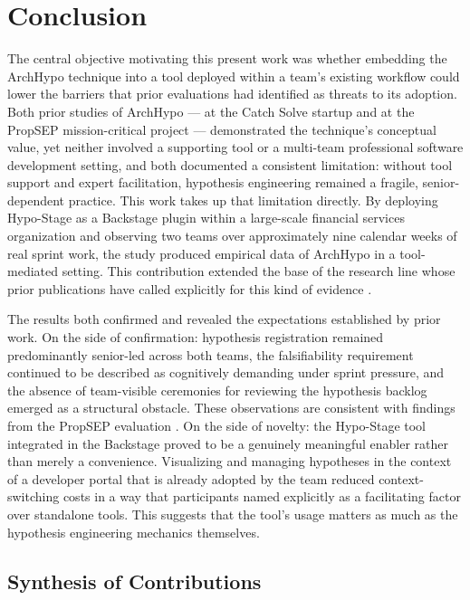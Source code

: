
\chapter{Conclusion}
\label{ch:conclusion}
\label{chap:conclusion}

The central objective motivating this present work was whether embedding the ArchHypo
technique into a tool deployed within a team's existing workflow could lower the barriers
that prior evaluations had identified as threats to its adoption. Both prior studies of
ArchHypo --- at the Catch Solve startup \citep{silva2024ieeesw} and at the PropSEP
mission-critical project \citep{silva2024tse} --- demonstrated the technique's conceptual
value, yet neither involved a supporting tool or a multi-team professional software development setting,
and both documented a consistent limitation: without tool support and expert
facilitation, hypothesis engineering remained a fragile, senior-dependent practice. This
work takes up that limitation directly. By deploying Hypo-Stage as a Backstage plugin
within a large-scale financial services organization and observing two teams over approximately nine calendar weeks of real sprint work, the study produced empirical data of ArchHypo in
a tool-mediated setting. This contribution extended the base of the research line whose prior publications have called explicitly for this kind of evidence \citep{silva2024patterns}.

The results both confirmed and revealed the expectations established by prior work.
On the side of confirmation: hypothesis registration remained predominantly senior-led
across both teams, the falsifiability requirement continued to be described as cognitively
demanding under sprint pressure, and the absence of team-visible ceremonies for reviewing
the hypothesis backlog emerged as a structural obstacle. These observations are consistent with findings
from the PropSEP evaluation \citep{silva2024tse}. On the side of novelty: the
Hypo-Stage tool integrated in the Backstage proved to be a genuinely meaningful enabler rather than merely a
convenience. Visualizing and managing hypotheses in the context of a developer portal 
that is already adopted by the team reduced context-switching costs in a way that
participants named explicitly as a facilitating factor over standalone tools. This
suggests that the tool's usage matters as much as the hypothesis engineering
mechanics themselves.

\section{Synthesis of Contributions}
\label{sec:conclusion-synthesis}


